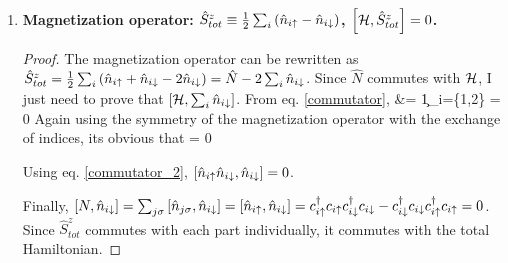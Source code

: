\documentclass{article}
\begin{document}
\begin{enumerate}
\begin{proof}
\begin{itemize}
\end{itemize}
The total Hamiltonian is just a sum of the three terms; since the number operator commutes individually with these terms, it obviously commutes with the total Hamiltonian.
\end{proof}
\item \bf{Magnetization operator}: \(\hat{S}^z_{tot} \equiv \frac{1}{2}\sum_i\left({\hat{n}_{i\uparrow}-\hat{n}_{i\downarrow}}\right)\), \(\left[{\mathcal{H}, \hat{S}^z_{tot}}\right]=0\).
\begin{proof}
The magnetization operator can be rewritten as \(\hat{S}^z_{tot} = \frac{1}{2}\sum_i\left({\hat{n}_{i\uparrow}+\hat{n}_{i\downarrow}-2\hat{n}_{i\downarrow}}\right) = \hat{N} - 2\sum_i\hat{n}_{i\downarrow}\). Since \(\hat{N}\) commutes with \(\mathcal{H}\), I just need to prove that \(\left[{\mathcal{H}, \sum_i\hat{n}_{i\downarrow}}\right]\). From eq. \ref{commutator}, 
\beq
{} &= \c{1}{\downarrow}\sum_{i=\{1,2\}} = 0
\eeq
Again using the symmetry of the magnetization operator with the exchange of indices, its obvious that
 = 0

Using eq. \ref{commutator_2}, \(\left[{\hat{n}_{i\uparrow}\hat{n}_{i\downarrow}, \hat{n}_{i\downarrow}}\right] = 0\).

Finally, \(\left[{N, \hat{n}_{i\downarrow}}\right]=\sum_{j\sigma}\left[{\hat{n}_{j\sigma},\hat{n}_{i\downarrow}}\right] = \left[{\hat{n}_{i\uparrow},\hat{n}_{i\downarrow}}\right] = c_{{i}{\uparrow}}^\dagger c_{{i}{\uparrow}}c_{{i}{\downarrow}}^\dagger c_{{i}{\downarrow}}-c_{{i}{\downarrow}}^\dagger c_{{i}{\downarrow}}c_{{i}{\uparrow}}^\dagger c_{{i}{\uparrow}} = 0\). Since \(\hat{S}^z_{tot}\) commutes with each part individually, it commutes with the total Hamiltonian.
\end{proof}


\end{enumerate}
\end{document}
